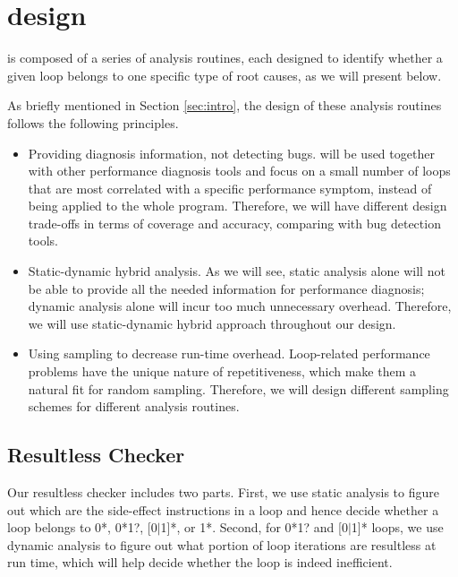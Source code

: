 \section{\Tool design}
\label{sec:design}
\Tool is composed of a series of analysis routines, each designed to 
identify whether a given loop belongs to one specific type of root causes,
as we will present below. 

As briefly mentioned in Section \ref{sec:intro}, the design of these analysis routines follows the following principles.
\begin{itemize}
\item Providing diagnosis information, not detecting bugs. \Tool will be  
used together with other performance diagnosis tools \citep{SongOOPSLA2014}
and focus on a small
number of loops that are most correlated with a specific performance symptom,
instead of being applied to the whole program. Therefore, we will have different
design trade-offs in terms of coverage and accuracy, comparing with 
bug detection tools.

\item Static-dynamic hybrid analysis. As we will see, static analysis alone
will not be able to provide all the needed information for performance
diagnosis; dynamic analysis alone will incur too much unnecessary overhead.
Therefore, we will use static-dynamic hybrid approach throughout our design.

\item Using sampling to decrease run-time overhead. Loop-related 
performance problems have the unique nature of repetitiveness, which make 
them a natural fit for random sampling. Therefore, we will design different
sampling schemes for different analysis routines.
\end{itemize}

\subsection{Resultless Checker}
\label{sec:workless}

Our resultless checker includes two parts. First, we use static analysis
to figure out which are the side-effect instructions in a loop and hence
decide whether a loop belongs to 0*, 0*1?, [0$|$1]*, or 1*. Second, for
0*1? and [0$|$1]* loops, we use
dynamic analysis to figure out what portion of loop iterations are
resultless at run time, which will help decide whether the loop is indeed
inefficient.


